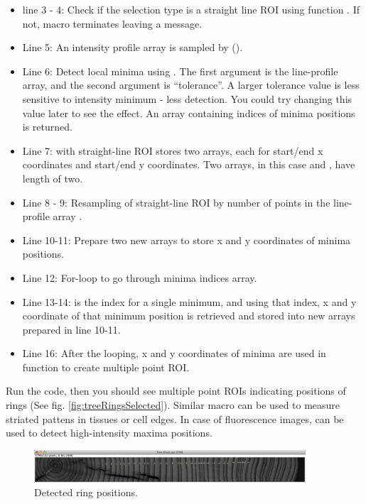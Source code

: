 \begin{itemize}
\item line 3 - 4:  Check if the selection type is a straight line ROI using function . If not, macro terminates leaving a message.
\item Line 5: An intensity profile array  is sampled by ().
\item Line 6: Detect local minima using . The first argument is the line-profile array, and the second argument is ``tolerance''. A larger tolerance value is less sensitive to intensity minimum - less detection. You could try changing this value later to see the effect. An array containing indices of minima positions is returned. 
\item Line 7:  with straight-line ROI stores two arrays, each for start/end x coordinates and start/end y coordinates. Two arrays, in this case  and , have length of two. 
\item Line 8 - 9: Resampling of straight-line ROI by number of points in the line-profile array .
\item Line 10-11: Prepare two new arrays to store x and y coordinates of minima positions. 
\item Line 12: For-loop to go through minima indices array. 
\item Line 13-14:  is the index for a single minimum, and using that index, x and y coordinate of that minimum position is retrieved and stored into new arrays prepared in line 10-11. 
\item Line 16: After the looping, x and y coordinates of minima are used in  function to create multiple point ROI. 
\end{itemize}

Run the code, then you should see multiple point ROIs indicating positions of rings (See fig. \ref{fig:treeRingsSelected}). Similar macro can be used to measure striated pattens in tissues or cell edges. In case of fluorescence images,  can be used to detect high-intensity maxima positions. 

\begin{figure}[h!]
\begin{center}
\includegraphics[width=0.9\textwidth]{fig/Tree_Rings_Minima.png}
\caption{Detected ring positions.}
\label{fig:treeRingsMinima}
\end{center}
\end{figure}


